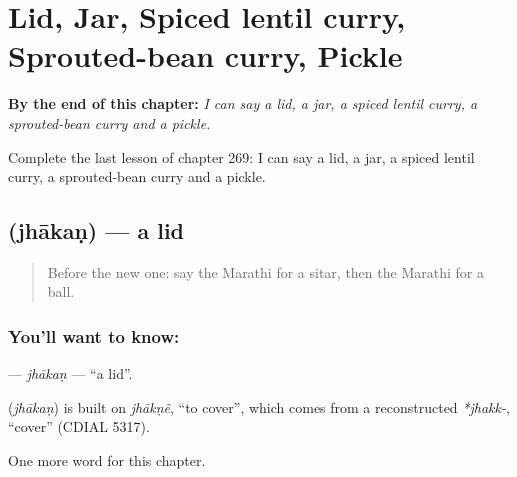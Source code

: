 
\chapter{Lid, Jar, Spiced lentil curry, Sprouted-bean curry, Pickle}
\label{ch:mr-lid-jar-spiced-lentil-curry-sprouted-bean-curry-pickle}

\begin{chapteropening}
\textbf{By the end of this chapter:} \emph{I can say a lid, a jar, a spiced lentil curry, a sprouted-bean curry and a pickle.}

Complete the last lesson of chapter 269: I can say a lid, a jar, a spiced lentil curry, a sprouted-bean curry and a pickle.
\end{chapteropening}

\section[\texorpdfstring{\mr{झाकण} (jhākaṇ)}{झाकण (jhākaṇ)}]{ (jhākaṇ) — a lid}

\label{lesson:MR-C269-jhakan}



\begin{quote}
Before the new one: say the Marathi for a sitar, then the Marathi for a ball.
\end{quote}

\subsection*{You'll want to know: }
\textbf{} — \emph{jhākaṇ} — \textquotedblleft{}a lid\textquotedblright{}.

\begin{cousinweb}
\textbf{} (\emph{jhākaṇ}) is built on \emph{jhākṇẽ}, \textquotedblleft{}to cover\textquotedblright{}, which comes from a reconstructed \emph{*jhakk-}, \textquotedblleft{}cover\textquotedblright{} (CDIAL 5317).
\end{cousinweb}

\begin{grammarlens}[title={What you've built}]
One more word for this chapter.
\end{grammarlens}

